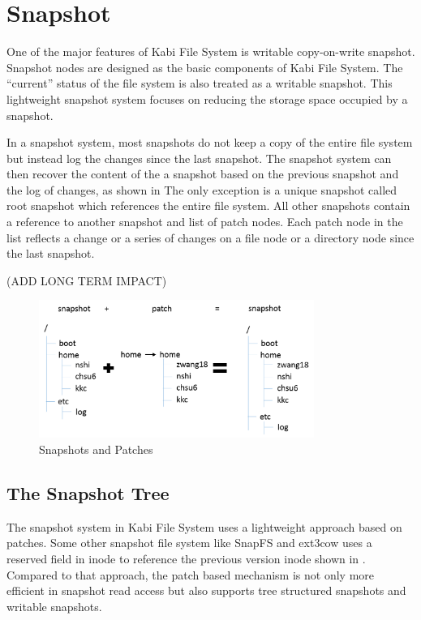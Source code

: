 \chapter{Snapshot}
\label{chap:snapshot}
    One of the major features of Kabi File System is writable copy-on-write snapshot. Snapshot nodes are designed as the basic components of Kabi File System. The ``current'' status of the file system is also treated as a writable snapshot. This lightweight snapshot system focuses on reducing the storage space occupied by a snapshot.

    In a snapshot system, most snapshots do not keep a copy of the entire file system but instead log the changes since the last snapshot. The snapshot system can then recover the content of the a snapshot based on the previous snapshot and the log of changes, as shown in  The only exception is a unique snapshot called root snapshot which references the entire file system. All other snapshots contain a reference to another snapshot and list of patch nodes. Each patch node in the list reflects a change or a series of changes on a file node or a directory node since the last snapshot.

    (ADD LONG TERM IMPACT)

\begin{figure}[hbtp]
\centering
\includegraphics[width=0.8\textwidth]{Chapter-4/figs/fig23.png}
\caption{Snapshots and Patches}
\label{fig:snapshot_patch}
\end{figure}

\section{The Snapshot Tree}

	The snapshot system in Kabi File System uses a lightweight approach based on patches. Some other snapshot file system like SnapFS and ext3cow uses a reserved field in inode to reference the previous version inode shown in . Compared to that approach, the patch based mechanism is not only more efficient in snapshot read access but also supports tree structured snapshots and writable snapshots.

